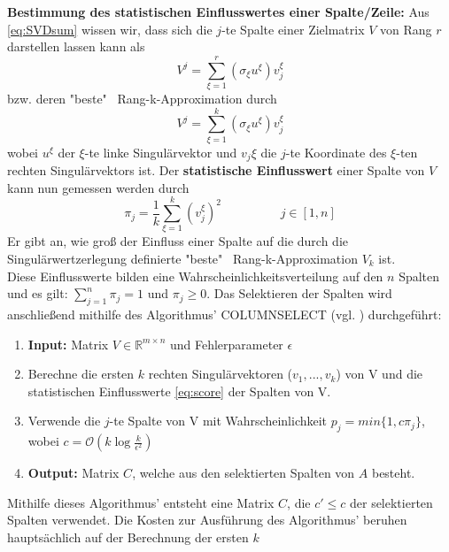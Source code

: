 \documentclass[12pt,a4paper,twoside]{article}
\begin{document}
		\textbf{Bestimmung des statistischen Einflusswertes einer Spalte/Zeile:} \newline 
		Aus \ref{eq:SVDsum} wissen wir, dass sich die $j$-te Spalte einer Zielmatrix $V$ von Rang $r$ darstellen lassen kann als
		\begin{equation*}
			V^j=\sum_{\xi=1}^r(\sigma_\xi u^\xi )v_j^\xi
		\end{equation*}
		bzw. deren "beste" \ Rang-k-Approximation durch
		\begin{equation*}
			V^j=\sum_{\xi=1}^k(\sigma_\xi u^\xi )v_j^\xi
		\end{equation*}
		wobei $u^\xi$ der $\xi$-te linke Singulärvektor und $v_j\xi$ die $j$-te Koordinate des $\xi$-ten rechten 
		Singulärvektors ist. Der \textbf{statistische Einflusswert} einer Spalte von $V$ kann nun gemessen werden durch
		\begin{equation}
			\label{eq:score}
			\pi_j=\frac{1}{k}\sum_{\xi=1}^k(v_j^\xi)^2 \hspace{2cm} j\in [1,n]
		\end{equation}
		Er gibt an, wie groß der Einfluss einer Spalte auf die durch die Singulärwertzerlegung definierte "beste" \ Rang-k-Approximation $V_k$ ist. \\
		Diese Einflusswerte bilden eine Wahrscheinlichkeitsverteilung auf den $n$ Spalten und es gilt: $\sum_{j=1}^n\pi_j=1$ und $\pi_j\geq 0$. \newline
		Das Selektieren der Spalten wird anschließend mithilfe des Algorithmus' COLUMNSELECT (vgl. \citep{mahoney2008}) durchgeführt: \newline
		\begin{enumerate}
			\item \textbf{Input:} Matrix $V\in \mathds{R}^{m\times n}$ und Fehlerparameter $\epsilon$
			\item Berechne die ersten $k$ rechten Singulärvektoren ($v_1,...,v_k$) von V und die statistischen Einflusswerte \ref{eq:score} der Spalten von V.
			\item Verwende die $j$-te Spalte von V mit Wahrscheinlichkeit $p_j=min\{1,c\pi_j\}$, wobei $c=\mathcal{O}(k \log \frac{k}{\epsilon^2})$
			\item \textbf{Output:} Matrix $C$, welche aus den selektierten Spalten von $A$ besteht.
		\end{enumerate}
		Mithilfe dieses Algorithmus' entsteht eine Matrix $C$, die $c'\leq c$ der selektierten Spalten verwendet. Die 
		Kosten zur Ausführung des Algorithmus' beruhen hauptsächlich auf der Berechnung der ersten $k$ 
\end{document}
